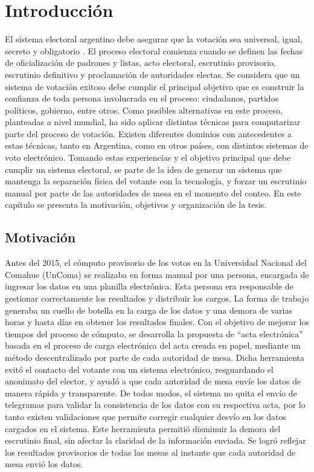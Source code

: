 \label{Introduccion}
\chapter{Introducción}
El sistema electoral argentino debe asegurar que la votación sea universal, igual, secreto y obligatorio \citep{arlettaz2012libertad}. El proceso electoral comienza cuando se definen las fechas de oficialización de padrones y listas, acto electoral, escrutinio provisorio, escrutinio definitivo y proclamación de autoridades electas. Se considera que un sistema de votación exitoso debe cumplir el principal objetivo que es construir la confianza de toda persona involucrada en el proceso: ciudadanos, partidos políticos, gobierno, entre otros. Como posibles alternativas en este proceso, planteadas a nivel mundial, ha sido aplicar distintas técnicas para computarizar parte del proceso de votación. Existen diferentes dominios con antecedentes a estas técnicas, tanto en Argentina, como en  otros  países,  con  distintos  sistemas  de  voto  electrónico. Tomando estas experiencias y el objetivo principal que debe cumplir un sistema electoral, se parte de la idea de generar un sistema que mantenga la separación física del votante con la tecnología, y forzar un escrutinio manual por parte de las autoridades de mesa en el momento del conteo. \newline
En este capítulo se presenta la motivación, objetivos y organización de la tesis.

\section{Motivación}
Antes del 2015, el cómputo provisorio de los votos en la Universidad Nacional del Comahue (UnComa) se realizaba en forma manual por una persona, encargada de ingresar los datos en una planilla electrónica. Esta persona era responsable de gestionar correctamente los resultados y distribuir los cargos. La forma de trabajo generaba un cuello de botella en la carga de los datos y una demora de varias horas y hasta días en obtener los resultados finales. \newline
Con el objetivo de mejorar los tiempos del proceso de cómputo, se desarrolla la propuesta de ``acta electrónica'' basada en el proceso de carga electrónica del acta creada en papel, mediante un método descentralizado  por parte de cada autoridad de mesa. Dicha herramienta evitó el contacto del votante con un sistema electrónico, resguardando el anonimato del elector, y ayudó a que cada autoridad de mesa envíe los datos de manera rápida y transparente. De todos modos, el sistema no quita el envío de telegramas para validar la consistencia de los datos con su respectiva acta, por lo tanto existen validaciones que permite corregir cualquier desvío en los datos cargados en el sistema. Este herramienta permitió disminuir la demora del escrutinio final, sin afectar la claridad de la información enviada. Se logró reflejar los resultados provisorios de todas las mesas al instante que cada autoridad de mesa envió los datos.

